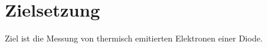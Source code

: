 \section{Zielsetzung}
\label{sec:Ziel}
Ziel ist die Messung von thermisch emitierten Elektronen einer Diode.
